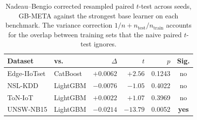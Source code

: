\begin{table}[t]
\centering
\caption{Nadeau--Bengio corrected resampled paired $t$-test across seeds, GB-META against the strongest base learner on each benchmark. The variance correction $1/n + n_{\mathrm{test}}/n_{\mathrm{train}}$ accounts for the overlap between training sets that the naive paired $t$-test ignores.}
\label{tab:nbt}
\begin{tabular}{llrrrc}
\toprule
Dataset & vs. & $\Delta$ & $t$ & $p$ & Sig. \\
\midrule
Edge-IIoTset & CatBoost & $+0.0062$ & $+2.56$ & 0.1243 & no \\
NSL-KDD & LightGBM & $-0.0076$ & $-1.05$ & 0.4022 & no \\
ToN-IoT & LightGBM & $+0.0022$ & $+1.07$ & 0.3969 & no \\
UNSW-NB15 & LightGBM & $-0.0214$ & $-13.79$ & 0.0052 & \textbf{yes} \\
\bottomrule
\end{tabular}

\end{table}

